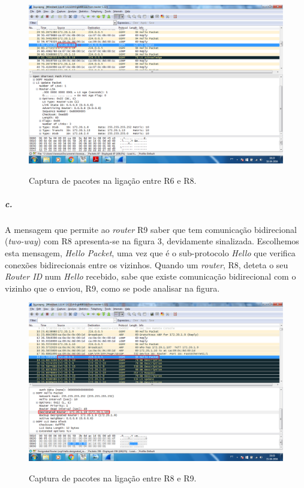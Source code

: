 \begin{figure}[h]
\centering
\includegraphics[width=1\textwidth, height=0.45\textheight]{2b.png}
\label{fig:captura R8-R6}
\caption{Captura de pacotes na ligação entre \textsf{R6} e \textsf{R8}.}
\end{figure}

\subparagraph{c.}
A mensagem que permite ao \emph{router} \textsf{R9} saber que tem comunicação bidirecional (\emph{two-way}) com \textsf{R8} apresenta-se na figura 3, devidamente sinalizada. Escolhemos esta mensagem, \emph{Hello Packet}, uma vez que é o sub-protocolo \emph{Hello} que verifica conexões bidirecionais entre os vizinhos. Quando um \emph{router}, \textsf{R8}, deteta o seu \emph{Router ID} num \emph{Hello} recebido, sabe que existe comunicação bidirecional com o vizinho que o enviou, \textsf{R9}, como se pode analisar na figura.

\begin{figure}[h]
\centering
\includegraphics[width=1\textwidth, height=0.45\textheight]{2c.png}
\label{fig:captura R8-R9}
\caption{Captura de pacotes na ligação entre \textsf{R8} e \textsf{R9}.}
\end{figure}

